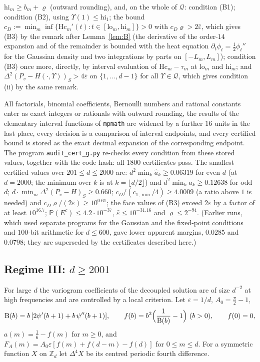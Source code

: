 \documentclass[11pt]{amsart}
\theoremstyle{definition}
\theoremstyle{remark}
\numberwithin{equation}{section}
\newcommand{\Z}{\mathbb{Z}}
\renewcommand{\Pr}{\mathbb{P}}
\begin{document}
\begin{enumerate}
$\mathrm{hi}_m\ge b_m+\varrho$ (outward rounding), and, on the whole of $\mathcal Q$: condition (B1); condition (B2),
using $\Upsilon(1)\le\mathrm{hi}_1$; the bound $c_D:=\min_m\inf\{\mathrm{Hc}_m'(t):t\in[\mathrm{lo}_m,\mathrm{hi}_m]\}>0$
with $c_D\varrho>2\bar\varepsilon$, which gives (B3) by the remark after Lemma~\ref{lem:B} (the derivative of the
order-$14$ expansion and of the remainder is bounded with the heat equation $\partial_t\phi_t=\frac12\phi_t''$ for the
Gaussian density and two integrations by parts on $[-L_m,L_m]$); condition (B3) once more, directly, by interval
evaluation of $\mathrm{Hc}_m-\tau_m$ at $\mathrm{lo}_m$ and $\mathrm{hi}_m$; and
$\Delta^2(P_v-H(\cdot,\Upsilon))_S>4\bar\varepsilon$ on $\{1,\dots,d-1\}$ for all $\Upsilon\in\mathcal Q$, which gives
condition (ii) by the same remark.
\end{enumerate}
All factorials, binomial coefficients, Bernoulli numbers and rational constants enter as exact integers or rationals
with outward rounding, the results of the elementary interval functions of \texttt{mpmath} are widened by a further
$16$ units in the last place, every decision is a comparison of interval endpoints, and every certified bound is stored
as the exact decimal expansion of the corresponding endpoint. The program \texttt{audit\_cert\_g.py} re-checks every
condition from these stored values, together with the code hash: all $1800$ certificates pass. The smallest certified
values over $201\le d\le2000$ are: $d^2\min_k\hat a_k\ge0.06319$ for even $d$ (at $d=2000$; the minimum over $k$ is at
$k=\lfloor d/2\rfloor$) and $d^2\min_k\hat a_k\ge0.12638$ for odd $d$; $d\cdot\min_m\Delta^2(P_v-H)_S\ge0.660$;
$c_D/(c_{1,\min}/4)\ge4.0009$ (a ratio above $1$ is needed) and $c_D\varrho/(2\bar\varepsilon)\ge10^{0.61}$; the face
values of (B3) exceed $2\bar\varepsilon$ by a factor of at least $10^{16.7}$; $\Pr(E^c)\le4.2\cdot10^{-37}$,
$\bar\varepsilon\le10^{-31.16}$ and $\varrho\le2^{-94}$. (Earlier runs, which used separate programs for the Gaussian and
the fixed-point conditions and $100$-bit arithmetic for $d\le600$, gave lower apparent margins, $0.0285$ and $0.0798$;
they are superseded by the certificates described here.)

\subsection{Regime III: \texorpdfstring{$d\ge2001$}{d >= 2001}}\label{subsec:regimeIII}
For large $d$ the variogram coefficients of the decoupled solution are of size $d^{-2}$ at high frequencies and are
controlled by a local criterion. Let $\varepsilon=1/d$, $A_0=\frac\pi2-1$,
\[
\mathrm{B}(b)=b\,[2\psi'(b+1)+b\,\psi''(b+1)],\qquad f(b)=b^2\Bigl(\frac1{\mathrm{B}(b)}-1\Bigr)\ (b>0),\qquad f(0)=0,
\]
$a(m)=\frac16-f(m)$ for $m\ge0$, and $F_A(m)=A_0\varepsilon[f(m)+f(d-m)-f(d)]$ for $0\le m\le d$. For a symmetric function $X$ on $\Z_d$ let $\Delta^4X$ be its
centred periodic fourth difference.
\end{document}
